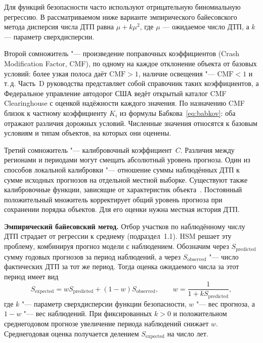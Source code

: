 \documentclass[coursework]{SCWorks}
\begin{document}
Для функций безопасности часто используют отрицательную биномиальную
регрессию. В рассматриваемом ниже варианте эмпирического байесовского
метода дисперсия числа ДТП равна $\mu+k\mu^2$, где $\mu$ --- ожидаемое
число ДТП, а $k$ --- параметр сверхдисперсии.

Второй сомножитель "--- произведение поправочных коэффициентов (Crash
Modification Factor, CMF), по одному на каждое отклонение объекта от
базовых условий: более узкая полоса даёт $\mathrm{CMF} > 1$, наличие
освещения "--- $\mathrm{CMF} < 1$ и т.\,д. Часть~D руководства
представляет собой справочник таких коэффициентов, а Федеральное
управление автодорог США ведёт открытый каталог CMF Clearinghouse с
оценкой надёжности каждого значения. По назначению CMF близок к
частному коэффициенту $K_i$ из формулы Бабкова~\eqref{eq:babkov}:
оба отражают различия дорожных условий. Численные значения относятся
к базовым условиям и типам объектов, на которых они оценены.

Третий сомножитель "--- калибровочный коэффициент~$C$. Различия
между регионами и периодами могут смещать абсолютный уровень прогноза.
Один из способов локальной калибровки "--- отношение суммы наблюдённых
ДТП к сумме исходных прогнозов на отдельной местной выборке.
Существуют также калибровочные функции, зависящие от характеристик
объекта~\cite{fhwacalibrator2018}.
Постоянный положительный множитель корректирует общий уровень
прогноза при сохранении порядка объектов. Для его оценки нужна
местная история ДТП.

\textbf{Эмпирический байесовский метод.} Отбор участков по наблюдённому
числу ДТП страдает от регрессии к среднему (подраздел~1.1). HSM решает
эту проблему, комбинируя прогноз модели с наблюдением. Обозначим
через $S_{\text{predicted}}$ сумму годовых прогнозов за период
наблюдений, а через $S_{\text{observed}}$ "--- число фактических ДТП
за тот же период. Тогда оценка ожидаемого числа за этот период имеет вид
\begin{equation}
  S_{\text{expected}} = w S_{\text{predicted}}
  + (1-w)S_{\text{observed}}, \qquad
  w = \frac{1}{1+k S_{\text{predicted}}},
  \label{eq:eb}
\end{equation}
где $k$ "--- параметр сверхдисперсии функции безопасности, $w$ "---
вес прогноза, а $1-w$ "--- вес наблюдений. При фиксированных $k>0$
и положительном среднегодовом прогнозе увеличение периода наблюдений
снижает $w$. Среднегодовая оценка получается делением
$S_{\text{expected}}$ на число лет.
\end{document}
